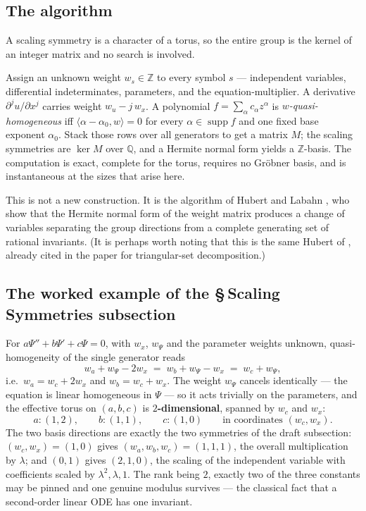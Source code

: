 \documentclass[11pt]{article}
\newcommand{\ZZ}{\mathbb{Z}}
\newcommand{\QQ}{\mathbb{Q}}
\theoremstyle{plain}
\theoremstyle{definition}
\theoremstyle{remark}
\begin{document}
\subsection{The algorithm}

A scaling symmetry is a character of a torus, so the entire group is the kernel
of an integer matrix and no search is involved.

Assign an unknown weight $w_s \in \ZZ$ to every symbol $s$ --- independent
variables, differential indeterminates, parameters, and the equation-multiplier.
A derivative $\partial^j u / \partial x^j$ carries weight $w_u - j\,w_x$. A
polynomial $f = \sum_\alpha c_\alpha z^\alpha$ is \emph{$w$-quasi-homogeneous}
iff $\langle \alpha - \alpha_0, w\rangle = 0$ for every $\alpha \in
\operatorname{supp} f$ and one fixed base exponent $\alpha_0$. Stack those rows
over all generators to get a matrix $M$; the scaling symmetries are
$\ker M$ over $\QQ$, and a Hermite normal form yields a $\ZZ$-basis. The
computation is exact, complete for the torus, requires no Gr\"obner basis, and
is instantaneous at the sizes that arise here.

This is not a new construction. It is the algorithm of Hubert and Labahn
\cite{HubertLabahnISSAC,HubertLabahnFoCM}, who show that the Hermite normal
form of the weight matrix produces a change of variables separating the group
directions from a complete generating set of rational invariants. (It is
perhaps worth noting that this is the same Hubert of \cite{hubert,hubert2},
already cited in the paper for triangular-set decomposition.)

\subsection{The worked example of the \S\,Scaling Symmetries subsection}

For $a\Psi'' + b\Psi' + c\Psi = 0$, with $w_x$, $w_\Psi$ and the parameter
weights unknown, quasi-homogeneity of the single generator reads
\[
   w_a + w_\Psi - 2w_x \;=\; w_b + w_\Psi - w_x \;=\; w_c + w_\Psi ,
\]
i.e.\ $w_a = w_c + 2w_x$ and $w_b = w_c + w_x$. The weight $w_\Psi$ cancels
identically --- the equation is linear homogeneous in $\Psi$ --- so it acts
trivially on the parameters, and the effective torus on $(a,b,c)$ is
\textbf{$2$-dimensional}, spanned by $w_c$ and $w_x$:
\[
  a : (1,2), \qquad b : (1,1), \qquad c : (1,0)
  \qquad\text{in coordinates } (w_c, w_x).
\]
The two basis directions are exactly the two symmetries of the draft
subsection: $(w_c, w_x) = (1,0)$ gives $(w_a,w_b,w_c) = (1,1,1)$, the overall
multiplication by $\lambda$; and $(0,1)$ gives $(2,1,0)$, the scaling of the
independent variable with coefficients scaled by $\lambda^2, \lambda, 1$. The
rank being $2$, exactly two of the three constants may be pinned and one
genuine modulus survives --- the classical fact that a second-order linear ODE
has one invariant.
\end{document}
